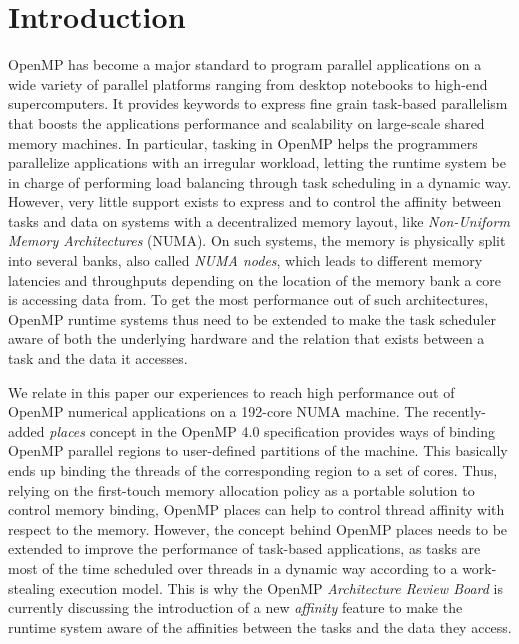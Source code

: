 \documentclass{Styles/llncs}
\begin{document}
\section{Introduction}

OpenMP has become a major standard to program parallel applications on a wide variety of parallel platforms ranging from desktop notebooks to high-end supercomputers. It provides keywords to express fine grain task-based parallelism that boosts the applications performance and scalability on large-scale shared memory machines. In particular, tasking in OpenMP helps the programmers parallelize applications with an irregular workload, letting the runtime system be in charge of performing load balancing through task scheduling in a dynamic way. However, very little support exists to express and to control the affinity between tasks and data on systems with a decentralized memory layout, like \emph{Non-Uniform Memory Architectures} (NUMA). On such systems, the memory is physically split into several banks, also called \emph{NUMA nodes}, which leads to different memory latencies and throughputs depending on the location of the memory bank a core is accessing data from. To get the most performance out of such architectures, OpenMP runtime systems thus need to be extended to make the task scheduler aware of both the underlying hardware and the relation that exists between a task and the data it accesses.

 We relate in this paper our experiences to reach high performance out of OpenMP numerical applications on a 192-core NUMA machine. The recently-added \emph{places} concept in the OpenMP 4.0 specification provides ways of binding OpenMP parallel regions to user-defined partitions of the machine. This basically ends up binding the threads of the corresponding region to a set of cores. Thus, relying on the first-touch memory allocation policy as a portable solution to control memory binding, OpenMP places can help to control thread affinity with respect to the memory.
However, the concept behind OpenMP places needs to be extended to improve the performance of task-based applications, as tasks are most of the time scheduled over threads in a dynamic way according to a work-stealing execution model.  This is why the OpenMP \emph{Architecture Review Board} is currently discussing the introduction of a new \textit{affinity} feature to make the runtime system aware of the affinities between the tasks and the data they access.
\end{document}
